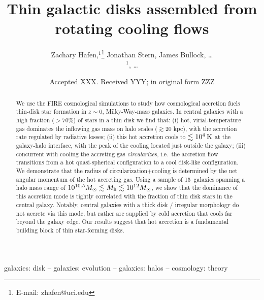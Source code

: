 \documentclass[fleqn,usenatbib]{mnras}
\title[Cooling flows and thin galactic disks]{Thin galactic disks assembled from rotating cooling flows}
\author[Hafen, Stern, Bullock et al.]{
Zachary Hafen,$^{1}$\thanks{E-mail: zhafen@uci.edu}
Jonathan Stern,
James Bullock,
\ldots
\\
$^1$,
\ldots
}
\date{Accepted XXX. Received YYY; in original form ZZZ}
\newcommand{\Rcon}{R_{T=10^5\,{\rm K}}}
\newcommand{\Nsample}{15}
\begin{document}
\label{firstpage}
\pagerange{\pageref{firstpage}--\pageref{lastpage}}
\maketitle

\begin{abstract}
We use the FIRE cosmological simulations to study how cosmological accretion fuels thin-disk star formation in $z\sim 0$, Milky-Way-mass galaxies.
In central galaxies with a high fraction ($>70\%$) of stars in a thin disk we find that:
(i) hot, virial-temperature gas dominates the inflowing gas mass on halo scales ($\gtrsim 20$ kpc), with the accretion rate regulated by radiative losses;
(ii) this hot accretion cools to $\lesssim10^4\,{\rm K}$ at the galaxy-halo interface, with the peak of the cooling located just outside the galaxy;
(iii) concurrent with cooling the accreting gas \textit{circularizes}, i.e.\ the accretion flow transitions from a hot quasi-spherical configuration to a cool disk-like configuration.
We demonstrate that the radius of circularization+cooling is determined by the net angular momentum of the hot accreting gas.
Using a sample of \Nsample~galaxies spanning a halo mass range of $10^{10.5} M_\odot \lesssim M_{\rm h} \lesssim 10^{12} M_\odot$, we show that the dominance of this accretion mode is tightly correlated with the fraction of thin disk stars in the central galaxy.
Notably, central galaxies with a thick disk / irregular morphology do not accrete via this mode, but rather are supplied by cold accretion that cools far beyond the galaxy edge.
Our results suggest that hot accretion is a fundamental building block of thin star-forming disks.
\end{abstract}

\begin{keywords}
galaxies: disk -- galaxies: evolution -- galaxies: halos -- cosmology: theory
\end{keywords}



\end{document}
